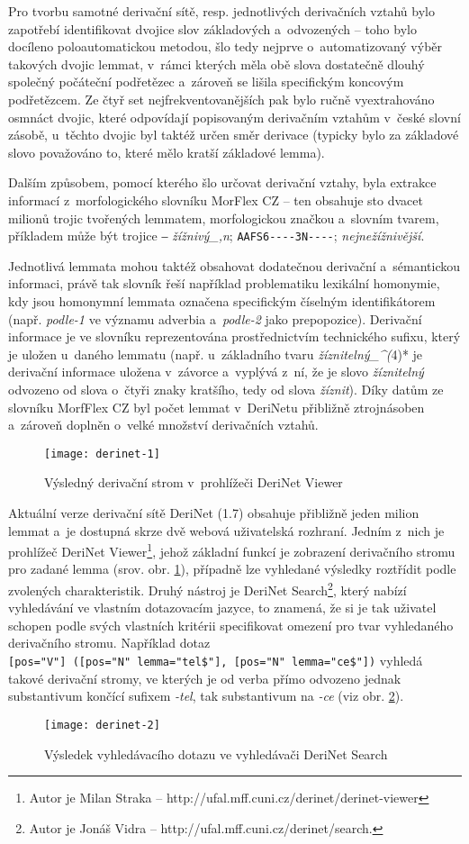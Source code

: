 Pro tvorbu samotné derivační sítě, resp. jednotlivých derivačních vztahů
bylo zapotřebí identifikovat dvojice slov základových a~odvozených --
toho bylo docíleno poloautomatickou metodou, šlo tedy nejprve
o~automatizovaný výběr takových dvojic lemmat, v~rámci kterých měla obě
slova dostatečně dlouhý společný počáteční podřetězec a~zároveň se
lišila specifickým koncovým podřetězcem. Ze čtyř set
nejfrekventovanějších pak bylo ručně vyextrahováno osmnáct dvojic, které
odpovídají popisovaným derivačním vztahům v~české slovní zásobě,
u~těchto dvojic byl taktéž určen směr derivace (typicky bylo za základové
slovo považováno to, které mělo kratší základové lemma).
\parencite{derinet-cz}

Dalším způsobem, pomocí kterého šlo určovat derivační vztahy, byla
extrakce informací z~morfologického slovníku MorFlex CZ -- ten obsahuje
sto dvacet milionů trojic tvořených lemmatem, morfologickou značkou
a~slovním tvarem, příkladem může být trojice ‒ \emph{žížnivý\_,n};
\texttt{AAFS6-\/-\/-\/-3N-\/-\/-\/-}; \emph{nejnežížnivější}.
\parencite{morflex}

Jednotlivá lemmata mohou taktéž obsahovat dodatečnou derivační
a~sémantickou informaci, právě tak slovník řeší například problematiku
lexikální homonymie, kdy jsou homonymní lemmata označena specifickým
číselným identifikátorem (např. \emph{podle-1} ve významu adverbia
a~\emph{podle-2} jako prepopozice). Derivační informace je ve slovníku
reprezentována prostřednictvím technického sufixu, který je uložen
u~daného lemmatu (např. u~základního tvaru \emph{žíznitelný\_\^{}(}4)* je
derivační informace uložena v~závorce a~vyplývá z~ní, že je slovo
\emph{žíznitelný} odvozeno od slova o~čtyři znaky kratšího, tedy od
slova \emph{žíznit}). Díky datům ze slovníku MorfFlex CZ byl počet
lemmat v~DeriNetu přibližně ztrojnásoben a~zároveň doplněn o~velké
množství derivačních vztahů.~\parencite{sevcikova16}

\begin{figure}[ht]   
    \centering
    \texttt{[image: derinet-1]}  
    \caption{Výsledný derivační strom v~prohlížeči DeriNet Viewer~\parencite{derinet}}
    \label{derinet-1}
 \end{figure}

Aktuální verze derivační sítě DeriNet (1.7) obsahuje přibližně jeden
milion lemmat a~je dostupná skrze dvě webová uživatelská rozhraní.
Jedním z~nich je prohlížeč DeriNet
Viewer\footnote{Autor je Milan Straka -- http://ufal.mff.cuni.cz/derinet/derinet-viewer},
jehož základní funkcí je zobrazení derivačního stromu pro zadané lemma
(srov. obr. \ref{derinet-1}), případně lze vyhledané výsledky roztřídit
podle zvolených charakteristik. Druhý nástroj je DeriNet
Search\footnote{Autor je Jonáš Vidra -- http://ufal.mff.cuni.cz/derinet/search.},
který nabízí vyhledávání ve vlastním dotazovacím jazyce, to znamená, že
si je tak uživatel schopen podle svých vlastních kritérii specifikovat
omezení pro tvar vyhledaného derivačního stromu. Například dotaz
\texttt{{[}pos="V"{]}\ ({[}pos="N"\ lemma="tel\$"{]},\ {[}pos="N"\ lemma="ce\$"{]})}
vyhledá takové derivační stromy, ve kterých je od verba přímo odvozeno
jednak substantivum končící sufixem \emph{-tel}, tak substantivum na
\emph{-ce} (viz obr. \ref{derinet-2}).~\parencite{derinet-cz}

\begin{figure}[ht]   
    \centering
    \texttt{[image: derinet-2]}  
    \caption{Výsledek vyhledávacího dotazu ve vyhledávači DeriNet Search~\parencite{derinet}}
    \label{derinet-2}
 \end{figure}
